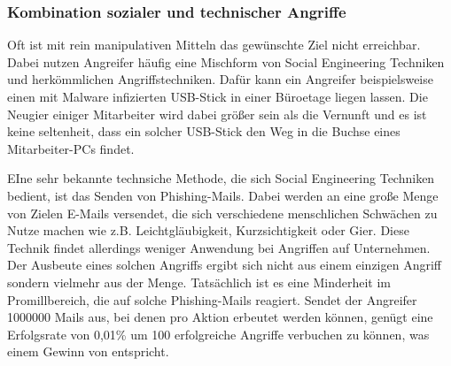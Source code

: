 \subsubsection{Kombination sozialer und technischer Angriffe}\label{kombination}
Oft ist mit rein manipulativen Mitteln das gewünschte Ziel nicht erreichbar.
Dabei nutzen Angreifer häufig eine Mischform von Social Engineering Techniken und herkömmlichen
Angriffstechniken.
Dafür kann ein Angreifer beispielsweise einen mit Malware infizierten USB-Stick in einer Büroetage
liegen lassen.
Die Neugier einiger Mitarbeiter wird dabei größer sein als die Vernunft und es ist keine seltenheit,
dass ein solcher USB-Stick den Weg in die Buchse eines Mitarbeiter-PCs findet.

EIne sehr bekannte technsiche Methode, die sich Social Engineering Techniken bedient, ist das Senden
von Phishing-Mails.
Dabei werden an eine große Menge von Zielen E-Mails versendet, die sich verschiedene menschlichen
Schwächen zu Nutze machen wie z.B. Leichtgläubigkeit, Kurzsichtigkeit oder Gier.
Diese Technik findet allerdings weniger Anwendung bei Angriffen auf Unternehmen.
Der Ausbeute eines solchen Angriffs ergibt sich nicht aus einem einzigen Angriff sondern vielmehr aus
der Menge.
Tatsächlich ist es eine Minderheit im Promillbereich, die auf solche Phishing-Mails reagiert.
Sendet der Angreifer 1000000 Mails aus, bei denen pro Aktion  erbeutet werden können, genügt
eine Erfolgsrate von 0,01\% um 100 erfolgreiche Angriffe verbuchen zu können, was einem Gewinn von
 entspricht. \cite{hacking-the-human}